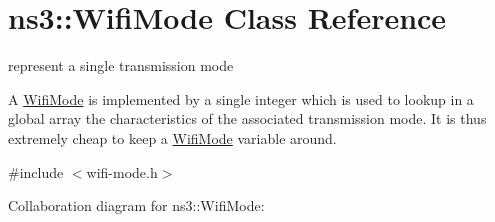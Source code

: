 \hypertarget{classns3_1_1WifiMode}{}\section{ns3\+:\+:Wifi\+Mode Class Reference}
\label{classns3_1_1WifiMode}


represent a single transmission mode

A \hyperlink{classns3_1_1WifiMode}{Wifi\+Mode} is implemented by a single integer which is used to lookup in a global array the characteristics of the associated transmission mode. It is thus extremely cheap to keep a \hyperlink{classns3_1_1WifiMode}{Wifi\+Mode} variable around.  




{\ttfamily \#include $<$wifi-\/mode.\+h$>$}



Collaboration diagram for ns3\+:\+:Wifi\+Mode\+:
